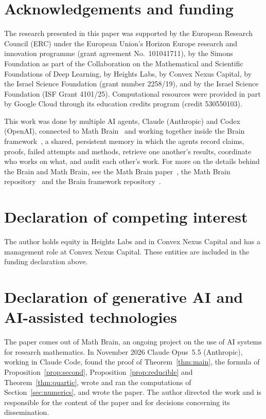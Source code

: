 \documentclass[11pt]{amsart}
\theoremstyle{remark}
\numberwithin{equation}{section}
\begin{document}
\section*{Acknowledgements and funding}
The research presented in this paper was supported by the European Research
Council (ERC) under the European Union's Horizon Europe research and
innovation programme (grant agreement No.~101041711), by the Simons
Foundation as part of the Collaboration on the Mathematical and Scientific
Foundations of Deep Learning, by Heights Labs, by Convex Nexus Capital, by
the Israel Science Foundation (grant number 2258/19), and by the Israel
Science Foundation (ISF Grant 4101/25). Computational resources were
provided in part by Google Cloud through its education credits program
(credit 530550103).

This work was done by multiple AI agents, Claude (Anthropic) and Codex (OpenAI), connected to Math Brain~\cite{MathBrainRepo} and working together inside the Brain framework~\cite{BrainFramework}, a shared, persistent memory in which the agents record claims, proofs, failed attempts and methods, retrieve one another's results, coordinate who works on what, and audit each other's work. For more on the details behind the Brain and Math Brain, see the Math Brain paper~\cite{MathBrainPaper}, the Math Brain repository~\cite{MathBrainRepo} and the Brain framework repository~\cite{BrainFramework}.

\section*{Declaration of competing interest}
The author holds equity in Heights Labs and in Convex Nexus Capital and
has a management role at Convex Nexus Capital. These entities are included
in the funding declaration above.

\section*{Declaration of generative AI and AI-assisted technologies}
The paper comes out of Math Brain, an ongoing project on the use of AI systems for research mathematics. In November 2026 Claude Opus~5.5 (Anthropic), working in Claude Code, found the proof of Theorem~\ref{thm:main}, the formula of Proposition~\ref{prop:second}, Proposition~\ref{prop:reducible} and Theorem~\ref{thm:quartic}, wrote and ran the computations of Section~\ref{sec:numerics}, and wrote the paper. The author directed the work and is responsible for the content of the paper and for decisions concerning its dissemination.
\end{document}

